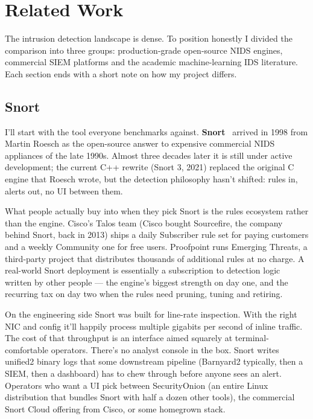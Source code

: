 \chapter{Related Work}
\label{chap:related-work}

The intrusion detection landscape is dense. To position \nidsname{}
honestly I divided the comparison into three groups: production-grade
open-source NIDS engines, commercial SIEM platforms and the academic
machine-learning IDS literature. Each section ends with a short note
on how my project differs.

\section{Snort}
\label{sec:rw-snort}

I'll start with the tool everyone benchmarks against.
\textbf{Snort}~\cite{roesch1999snort} arrived in 1998 from Martin
Roesch as the open-source answer to expensive commercial NIDS
appliances of the late 1990s. Almost three decades later it is
still under active development; the current C++ rewrite (Snort 3,
2021) replaced the original C engine that Roesch wrote, but the
detection philosophy hasn't shifted: rules in, alerts out, no UI
between them.

What people actually buy into when they pick Snort is the rules
ecosystem rather than the engine. Cisco's Talos team (Cisco bought
Sourcefire, the company behind Snort, back in 2013) ships a daily
Subscriber rule set for paying customers and a weekly Community
one for free users. Proofpoint runs Emerging Threats, a
third-party project that distributes thousands of additional
rules at no charge. A real-world Snort deployment is essentially
a subscription to detection logic written by other people --- the
engine's biggest strength on day one, and the recurring tax on
day two when the rules need pruning, tuning and retiring.

On the engineering side Snort was built for line-rate inspection.
With the right NIC and config it'll happily process multiple
gigabits per second of inline traffic. The cost of that
throughput is an interface aimed squarely at terminal-comfortable
operators. There's no analyst console in the box. Snort writes
unified2 binary logs that some downstream pipeline
(Barnyard2 typically, then a SIEM, then a dashboard) has to chew
through before anyone sees an alert. Operators who want a UI pick
between SecurityOnion (an entire Linux distribution that bundles
Snort with half a dozen other tools), the commercial Snort Cloud
offering from Cisco, or some homegrown stack.


